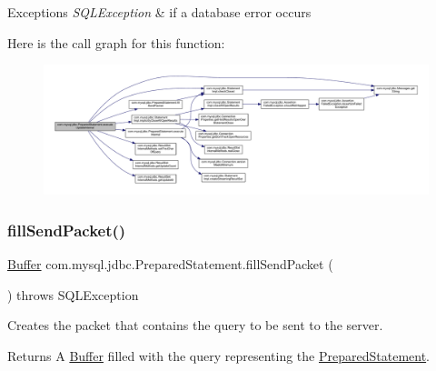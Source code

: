 \begin{DoxyExceptions}{Exceptions}
{\em S\+Q\+L\+Exception} & if a database error occurs \\
\hline
\end{DoxyExceptions}
Here is the call graph for this function\+:
\nopagebreak
\begin{figure}[H]
\begin{center}
\leavevmode
\includegraphics[width=350pt]{classcom_1_1mysql_1_1jdbc_1_1_prepared_statement_a5f77388e9afc0a2fcb248732c3c91577_cgraph}
\end{center}
\end{figure}
\mbox{\label{classcom_1_1mysql_1_1jdbc_1_1_prepared_statement_a0f1235a6e911d9370ef27e6ba5932d89}} 
\subsubsection{\texorpdfstring{fill\+Send\+Packet()}{fillSendPacket()}\hspace{0.1cm}{\footnotesize\ttfamily [1/2]}}
{\footnotesize\ttfamily \mbox{\hyperlink{classcom_1_1mysql_1_1jdbc_1_1_buffer}{Buffer}} com.\+mysql.\+jdbc.\+Prepared\+Statement.\+fill\+Send\+Packet (\begin{DoxyParamCaption}{ }\end{DoxyParamCaption}) throws S\+Q\+L\+Exception\hspace{0.3cm}{\ttfamily [protected]}}

Creates the packet that contains the query to be sent to the server.

\begin{DoxyReturn}{Returns}
A \mbox{\hyperlink{classcom_1_1mysql_1_1jdbc_1_1_buffer}{Buffer}} filled with the query representing the \mbox{\hyperlink{classcom_1_1mysql_1_1jdbc_1_1_prepared_statement}{Prepared\+Statement}}.
\end{DoxyReturn}

